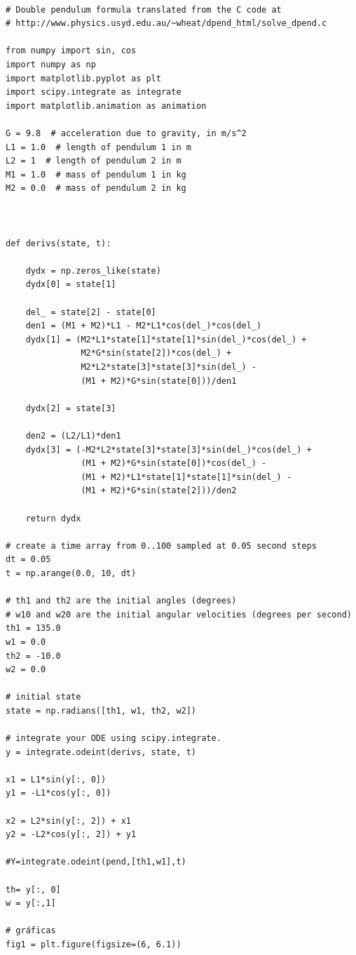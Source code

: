 \documentclass[11pt,spanish]{article}
\begin{document}
\begin{lstlisting}

# Double pendulum formula translated from the C code at
# http://www.physics.usyd.edu.au/~wheat/dpend_html/solve_dpend.c

from numpy import sin, cos
import numpy as np
import matplotlib.pyplot as plt
import scipy.integrate as integrate
import matplotlib.animation as animation

G = 9.8  # acceleration due to gravity, in m/s^2
L1 = 1.0  # length of pendulum 1 in m
L2 = 1  # length of pendulum 2 in m
M1 = 1.0  # mass of pendulum 1 in kg
M2 = 0.0  # mass of pendulum 2 in kg

 
    
def derivs(state, t):

    dydx = np.zeros_like(state)
    dydx[0] = state[1]

    del_ = state[2] - state[0]
    den1 = (M1 + M2)*L1 - M2*L1*cos(del_)*cos(del_)
    dydx[1] = (M2*L1*state[1]*state[1]*sin(del_)*cos(del_) +
               M2*G*sin(state[2])*cos(del_) +
               M2*L2*state[3]*state[3]*sin(del_) -
               (M1 + M2)*G*sin(state[0]))/den1

    dydx[2] = state[3]

    den2 = (L2/L1)*den1
    dydx[3] = (-M2*L2*state[3]*state[3]*sin(del_)*cos(del_) +
               (M1 + M2)*G*sin(state[0])*cos(del_) -
               (M1 + M2)*L1*state[1]*state[1]*sin(del_) -
               (M1 + M2)*G*sin(state[2]))/den2

    return dydx

# create a time array from 0..100 sampled at 0.05 second steps
dt = 0.05
t = np.arange(0.0, 10, dt)

# th1 and th2 are the initial angles (degrees)
# w10 and w20 are the initial angular velocities (degrees per second)
th1 = 135.0
w1 = 0.0
th2 = -10.0
w2 = 0.0

# initial state
state = np.radians([th1, w1, th2, w2])

# integrate your ODE using scipy.integrate.
y = integrate.odeint(derivs, state, t)

x1 = L1*sin(y[:, 0])
y1 = -L1*cos(y[:, 0])

x2 = L2*sin(y[:, 2]) + x1
y2 = -L2*cos(y[:, 2]) + y1

#Y=integrate.odeint(pend,[th1,w1],t)

th= y[:, 0]
w = y[:,1]

# gráficas
fig1 = plt.figure(figsize=(6, 6.1))


\end{lstlisting}
\end{document}
